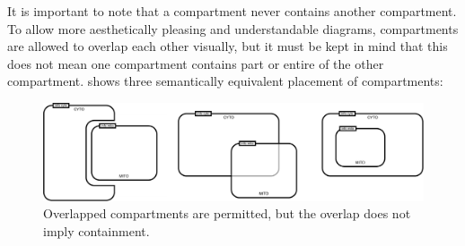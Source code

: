 



It is important to note that a compartment never contains another compartment. To allow more aesthetically pleasing and understandable diagrams, compartments are allowed to overlap each other visually, but it must be kept in mind that this does not mean one compartment contains part or entire of the other compartment.   shows three semantically equivalent placement of compartments:

\begin{figure}[H]
  \centering
  \includegraphics[scale = 0.4]{src/images/build/compartment_overlapping_example.pdf}
  \caption{Overlapped compartments are permitted, but the overlap does not imply containment.}
  \label{fig:overlap}
\end{figure}

